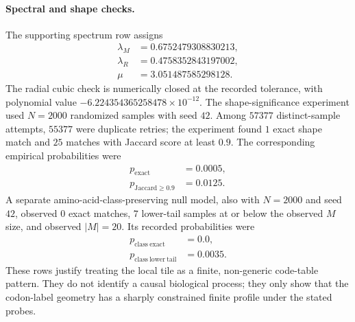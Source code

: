 \paragraph{Spectral and shape checks.}
The supporting spectrum row assigns
$$
\begin{aligned}
\lambda_M&=0.6752479308830213,\\
\lambda_R&=0.4758352843197002,\\
\mu&=3.051487585298128.
\end{aligned}
$$
The radial cubic check is numerically closed at the recorded tolerance, with polynomial value $-6.224354365258478\times 10^{-12}$.  The shape-significance experiment used $N=2000$ randomized samples with seed $42$.  Among $57377$ distinct-sample attempts, $55377$ were duplicate retries; the experiment found $1$ exact shape match and $25$ matches with Jaccard score at least $0.9$.  The corresponding empirical probabilities were
$$
\begin{aligned}
p_{\mathrm{exact}}&=0.0005,\\
p_{\mathrm{Jaccard}\geq 0.9}&=0.0125.
\end{aligned}
$$
A separate amino-acid-class-preserving null model, also with $N=2000$ and seed $42$, observed $0$ exact matches, $7$ lower-tail samples at or below the observed $M$ size, and observed $|M|=20$.  Its recorded probabilities were
$$
\begin{aligned}
p_{\mathrm{class\ exact}}&=0.0,\\
p_{\mathrm{class\ lower\ tail}}&=0.0035.
\end{aligned}
$$
These rows justify treating the local tile as a finite, non-generic code-table pattern.  They do not identify a causal biological process; they only show that the codon-label geometry has a sharply constrained finite profile under the stated probes.


